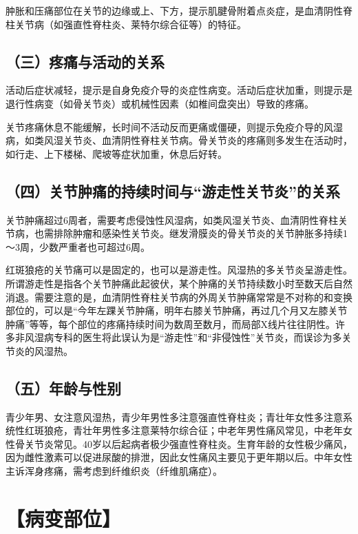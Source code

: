 肿胀和压痛部位在关节的边缘或上、下方，提示肌腱骨附着点炎症，是血清阴性脊柱关节病（如强直性脊柱炎、莱特尔综合征等）的特征。

\subsection{（三）疼痛与活动的关系}

活动后症状减轻，提示是自身免疫介导的炎症性病变。活动后症状加重，则提示是退行性病变（如骨关节炎）或机械性因素（如椎间盘突出）导致的疼痛。

关节疼痛休息不能缓解，长时间不活动反而更痛或僵硬，则提示免疫介导的风湿病，如类风湿关节炎、血清阴性脊柱关节病。骨关节炎的疼痛则多发生在活动时，如行走、上下楼梯、爬坡等症状加重，休息后好转。

\subsection{（四）关节肿痛的持续时间与“游走性关节炎”的关系}

关节肿痛超过6周者，需要考虑侵蚀性风湿病，如类风湿关节炎、血清阴性脊柱关节病，也需排除肿瘤和感染性关节炎。继发滑膜炎的骨关节炎的关节肿胀多持续1～3周，少数严重者也可超过6周。

红斑狼疮的关节痛可以是固定的，也可以是游走性。风湿热的多关节炎呈游走性。所谓游走性是指各个关节肿痛此起彼伏，某个肿痛的关节持续数小时至数天后自然消退。需要注意的是，血清阴性脊柱关节病的外周关节肿痛常常是不对称的和变换部位的，可以是“今年左踝关节肿痛，明年右膝关节肿痛，再过几个月又左膝关节肿痛”等等，每个部位的疼痛持续时间为数周至数月，而局部X线片往往阴性。许多非风湿病专科的医生将此误认为是“游走性”和“非侵蚀性”关节炎，而误诊为多关节炎的风湿热。

\subsection{（五）年龄与性别}

青少年男、女注意风湿热，青少年男性多注意强直性脊柱炎；青壮年女性多注意系统性红斑狼疮，青壮年男性多注意莱特尔综合征；中老年男性痛风常见，中老年女性骨关节炎常见。40岁以后起病者极少强直性脊柱炎。生育年龄的女性极少痛风，因为雌性激素可以促进尿酸的排泄，因此女性痛风主要见于更年期以后。中年女性主诉浑身疼痛，需考虑到纤维织炎（纤维肌痛症）。

\section{【病变部位】}

